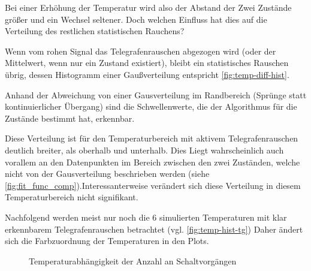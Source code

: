 \documentclass[main.tex]{subfiles}
\begin{document}
Bei einer Erhöhung der Temperatur wird also der Abstand der Zwei Zustände größer und ein Wechsel seltener. Doch welchen Einfluss hat dies auf die Verteilung des restlichen statistischen Rauchens?

Wenn vom rohen Signal das Telegrafenrauschen abgezogen wird (oder der Mittelwert, wenn nur ein Zustand existiert), bleibt ein statistisches Rauschen übrig, dessen Histogramm einer Gaußverteilung entspricht \cref{fig:temp-diff-hist}. 

Anhand der Abweichung von einer Gausverteilung im Randbereich (Sprünge statt kontinuierlicher Übergang) sind die Schwellenwerte, die der Algorithmus für die Zustände bestimmt hat, erkennbar.

Diese Verteilung ist für den Temperaturbereich mit aktivem Telegrafenrauschen deutlich breiter, als oberhalb und unterhalb. Dies Liegt wahrscheinlich auch vorallem an den Datenpunkten im Bereich zwischen den zwei Zuständen, welche nicht von der Gausverteilung beschrieben werden (siehe \cref{fig:fit_func_comp}).Interessanterweise verändert sich diese Verteilung in diesem Temperaturbereich nicht signifikant.

Nachfolgend werden meist nur noch die 6 simulierten Temperaturen mit klar erkennbarem Telegrafenrauschen betrachtet (vgl. \cref{fig:temp-hist-tg}) Daher ändert sich die Farbzuordnung der Temperaturen in den Plots.

\begin{figure}[H]
    \centering
    \caption{Temperaturabhängigkeit der Anzahl an Schaltvorgängen}\label{fig:temp-switch-count}
\end{figure}
\end{document}
